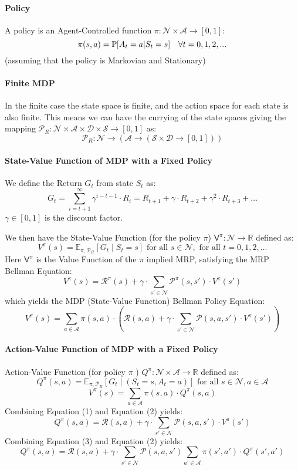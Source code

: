 \documentclass[11pt]{article}
\begin{document}
\paragraph*{Policy} A policy is an Agent-Controlled function $\pi:\mathcal{N}\times\mathcal{A}\rightarrow[0, 1]$:
$$
\pi(s, a) = \P{A_t = a|S_t = s} \quad \forall t = 0, 1, 2, ...
$$
(assuming that the policy is Markovian and Stationary)

\paragraph*{Finite MDP} In the finite case the state space is finite, and the action space for each state is also finite. This means we can have the currying of the state spaces giving the mapping $\mathcal{P}_R: \mathcal{N}\times\mathcal{A}\times\mathcal{D}\times\mathcal{S}\rightarrow[0, 1]$ as:
$$
\mathcal{P}_R: \mathcal{N}\rightarrow(\mathcal{A}\rightarrow(\mathcal{S}\times\mathcal{D}\rightarrow[0, 1]))
$$

\paragraph*{State-Value Function of MDP with a Fixed Policy} 
We define the Return $G_t$ from state $S_t$ as:
$$
G_t=\sum_{i=t+1}^{\infty} \gamma^{i-t-1} \cdot R_i=R_{t+1}+\gamma \cdot R_{t+2}+\gamma^2 \cdot R_{t+3}+\ldots
$$
$\gamma\in[0,1]$ is the discount factor.

We then have the State-Value Function (for the policy $\pi$) $\mathsf{V}^\pi:\mathcal{N}\rightarrow\mathbb{R}$ defined as:
$$
V^\pi(s)=\mathbb{E}_{\pi, \mathcal{P}_R}\left[G_t \mid S_t=s\right] \text { for all } s \in \mathcal{N}, \text { for all } t=0,1,2, \ldots
$$
Here $\mathsf{V}^\pi$ is the Value Function of the $\pi$ implied MRP, satisfying the MRP Bellman Equation:
$$
V^\pi(s)=\mathcal{R}^\pi(s)+\gamma \cdot \sum_{s' \in \mathcal{N}} \mathcal{P}^\pi\left(s, s'\right) \cdot V^\pi\left(s'\right)
$$
which yields the MDP (State-Value Function) Bellman Policy Equation:
$$
V^\pi(s)=\sum_{a \in \mathcal{A}} \pi(s, a) \cdot\left(\mathcal{R}(s, a)+\gamma \cdot \sum_{s' \in \mathcal{N}} \mathcal{P}\left(s, a, s'\right) \cdot V^\pi\left(s'\right)\right)
$$

\paragraph*{Action-Value Function of MDP with a Fixed Policy}
Action-Value Function (for policy $\pi$ ) $Q^\pi: \mathcal{N} \times \mathcal{A} \rightarrow \mathbb{R}$ defined as:
$$
Q^\pi(s, a)=\mathbb{E}_{\pi, \mathcal{P}_R}\left[G_t \mid\left(S_t=s, A_t=a\right)\right] \text { for all } s \in \mathcal{N}, a \in \mathcal{A}
$$
$$
V^\pi(s)=\sum_{a \in \mathcal{A}} \pi(s, a) \cdot Q^\pi(s, a)
$$
Combining Equation (1) and Equation (2) yields:
$$
Q^\pi(s, a)=\mathcal{R}(s, a)+\gamma \cdot \sum_{s' \in \mathcal{N}} \mathcal{P}\left(s, a, s'\right) \cdot V^\pi\left(s'\right)
$$
Combining Equation (3) and Equation (2) yields:
$$
Q^\pi(s, a)=\mathcal{R}(s, a)+\gamma \cdot \sum_{s' \in \mathcal{N}} \mathcal{P}\left(s, a, s'\right) \sum_{a' \in \mathcal{A}} \pi\left(s', a'\right) \cdot Q^\pi\left(s', a'\right)
$$
\end{document}
